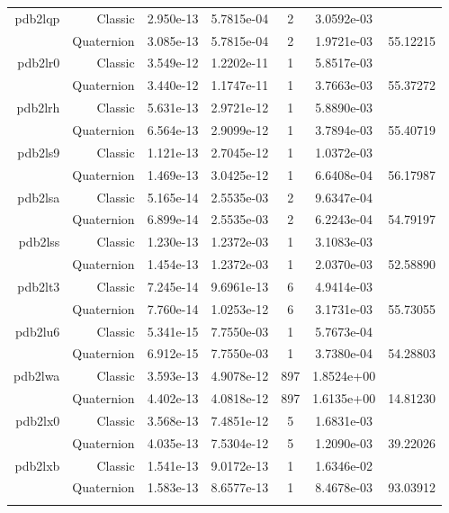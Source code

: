 \begin{xltabular}{\textwidth}{r|rS[table-format=1.3e+2]S[table-format=1.4e+2]cS[table-format=1.4e+2]S[table-format=-1.5]}
pdb2lqp & Classic & 2.950e-13 & 5.7815e-04 & 2 & 3.0592e-03 & \\
& Quaternion & 3.085e-13 & 5.7815e-04 & 2 & 1.9721e-03 & 55.12215\\  \addlinespace
pdb2lr0 & Classic & 3.549e-12 & 1.2202e-11 & 1 & 5.8517e-03 & \\
& Quaternion & 3.440e-12 & 1.1747e-11 & 1 & 3.7663e-03 & 55.37272\\  \addlinespace
pdb2lrh & Classic & 5.631e-13 & 2.9721e-12 & 1 & 5.8890e-03 & \\
& Quaternion & 6.564e-13 & 2.9099e-12 & 1 & 3.7894e-03 & 55.40719\\  \addlinespace
pdb2ls9 & Classic & 1.121e-13 & 2.7045e-12 & 1 & 1.0372e-03 & \\
& Quaternion & 1.469e-13 & 3.0425e-12 & 1 & 6.6408e-04 & 56.17987\\  \addlinespace
pdb2lsa & Classic & 5.165e-14 & 2.5535e-03 & 2 & 9.6347e-04 & \\
& Quaternion & 6.899e-14 & 2.5535e-03 & 2 & 6.2243e-04 & 54.79197\\  \addlinespace
pdb2lss & Classic & 1.230e-13 & 1.2372e-03 & 1 & 3.1083e-03 & \\
& Quaternion & 1.454e-13 & 1.2372e-03 & 1 & 2.0370e-03 & 52.58890\\  \addlinespace
pdb2lt3 & Classic & 7.245e-14 & 9.6961e-13 & 6 & 4.9414e-03 & \\
& Quaternion & 7.760e-14 & 1.0253e-12 & 6 & 3.1731e-03 & 55.73055\\  \addlinespace
pdb2lu6 & Classic & 5.341e-15 & 7.7550e-03 & 1 & 5.7673e-04 & \\
& Quaternion & 6.912e-15 & 7.7550e-03 & 1 & 3.7380e-04 & 54.28803\\  \addlinespace
pdb2lwa & Classic & 3.593e-13 & 4.9078e-12 & 897 & 1.8524e+00 & \\
& Quaternion & 4.402e-13 & 4.0818e-12 & 897 & 1.6135e+00 & 14.81230\\  \addlinespace
pdb2lx0 & Classic & 3.568e-13 & 7.4851e-12 & 5 & 1.6831e-03 & \\
& Quaternion & 4.035e-13 & 7.5304e-12 & 5 & 1.2090e-03 & 39.22026\\  \addlinespace
pdb2lxb & Classic & 1.541e-13 & 9.0172e-13 & 1 & 1.6346e-02 & \\
& Quaternion & 1.583e-13 & 8.6577e-13 & 1 & 8.4678e-03 & 93.03912\\  \addlinespace

\end{xltabular}
